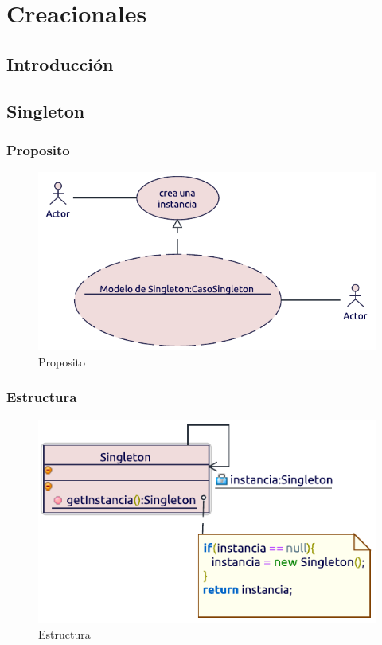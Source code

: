 \chapter{Creacionales}

\section{Introducción}

\newpage

\section{Singleton}

\subsection{Proposito}
\begin{figure}[ht!]
	\centering
	\includegraphics[width=0.7\linewidth]{Diseno/Creacionales/imgs/proposito}
	\caption{Proposito}
\end{figure}


\subsection{Estructura}
\begin{figure}[h!]
	\centering
	\includegraphics[width=0.7\linewidth]{Diseno/Creacionales/imgs/estructura}
	\caption{Estructura}
\end{figure}


